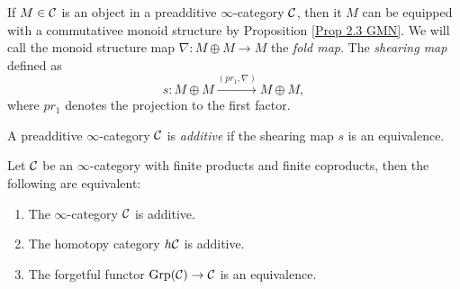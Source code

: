 If $M\in {\mathcal{C}}$ is an object in a preadditive $\infty$-category ${\mathcal{C}}$, then it $M$ can be equipped with a commutativee monoid structure by Proposition \ref{Prop 2.3 GMN}.
We will call the monoid structure map $\nabla:M\oplus M \to M$ the \emph{fold map}. 
The \emph{shearing map} defined as
$$
s: M\oplus M \xrightarrow{(pr_1, \nabla)} M\oplus M,
$$
where $pr_1$ denotes the projection to the first factor.

\begin{definition}
\cite[Definition 2.6]{Gepner-Moritz-Nikolaus}
    \label{additive}
    A preadditive $\infty$-category ${\mathcal{C}}$ is \emph{additive} if the shearing map $s$ is an equivalence.
\end{definition}

\begin{proposition}
\label{Prop 2.8 GMN}
\cite[Proposition 2.8]{Gepner-Moritz-Nikolaus}
Let ${\mathcal{C}}$ be an $\infty$-category with finite products and finite coproducts, 
    then the following are equivalent:
    \begin{enumerate}
      \item The $\infty$-category ${\mathcal{C}}$ is additive.
      \item The homotopy category $h{\mathcal{C}}$ is additive.
      \item The forgetful functor $\operatorname{Grp}({\mathcal{C}})\to {\mathcal{C}}$ is an equivalence.
    \end{enumerate}
\end{proposition}


